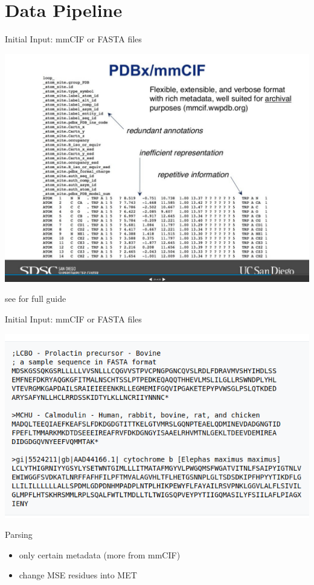 \documentclass[presentation, smaller]{beamer}
\begin{document}
\section*{Data Pipeline}
\label{sec:org11d2f66}
\begin{frame}[label={sec:orgc2d4375}]{Initial Input: mmCIF or FASTA files}
\begin{center}
\includegraphics[width=.9\linewidth]{./imgs/mmcif-eg.png}
\end{center}

see \cite{PDB101LearnGuide} for full guide
\end{frame}

\begin{frame}[label={sec:orga763d79}]{Initial Input: mmCIF or FASTA files}
\begin{center}
\includegraphics[width=.9\linewidth]{./imgs/fastafiles_2021-07-20.png}
\end{center}
\end{frame}

\begin{frame}[label={sec:org192b794}]{Parsing \cite{jumperHighlyAccurateProtein2021}}
\begin{itemize}
\item only certain metadata (more from mmCIF)
\item change MSE residues into MET
\end{itemize}
\end{frame}
\end{document}
